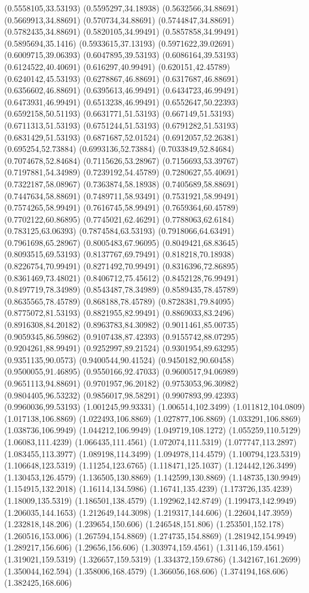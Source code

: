 \documentclass[12pt,letterpaper]{article}
\begin{document}
(0.5558105,33.53193) (0.5595297,34.18938) (0.5632566,34.88691) (0.5669913,34.88691) (0.570734,34.88691) (0.5744847,34.88691) (0.5782435,34.88691) (0.5820105,34.99491) (0.5857858,34.99491) (0.5895694,35.1416) (0.5933615,37.13193) (0.5971622,39.02691) (0.6009715,39.06393) (0.6047895,39.53193) (0.6086164,39.53193) (0.6124522,40.40691) (0.616297,40.99491) (0.620151,42.45789) (0.6240142,45.53193) (0.6278867,46.88691) (0.6317687,46.88691) (0.6356602,46.88691) (0.6395613,46.99491) (0.6434723,46.99491) (0.6473931,46.99491) (0.6513238,46.99491) (0.6552647,50.22393) (0.6592158,50.51193) (0.6631771,51.53193) (0.667149,51.53193) (0.6711313,51.53193) (0.6751244,51.53193) (0.6791282,51.53193) (0.6831429,51.53193) (0.6871687,52.01524) (0.6912057,52.26381) (0.695254,52.73884) (0.6993136,52.73884) (0.7033849,52.84684) (0.7074678,52.84684) (0.7115626,53.28967) (0.7156693,53.39767) (0.7197881,54.34989) (0.7239192,54.45789) (0.7280627,55.40691) (0.7322187,58.08967) (0.7363874,58.18938) (0.7405689,58.88691) (0.7447634,58.88691) (0.7489711,58.93491) (0.7531921,58.99491) (0.7574265,58.99491) (0.7616745,58.99491) (0.7659364,60.45789) (0.7702122,60.86895) (0.7745021,62.46291) (0.7788063,62.6184) (0.783125,63.06393) (0.7874584,63.53193) (0.7918066,64.63491) (0.7961698,65.28967) (0.8005483,67.96095) (0.8049421,68.83645) (0.8093515,69.53193) (0.8137767,69.79491) (0.818218,70.18938) (0.8226754,70.99491) (0.8271492,70.99491) (0.8316396,72.86895) (0.8361469,73.48021) (0.8406712,75.45612) (0.8452128,76.99491) (0.8497719,78.34989) (0.8543487,78.34989) (0.8589435,78.45789) (0.8635565,78.45789) (0.868188,78.45789) (0.8728381,79.84095) (0.8775072,81.53193) (0.8821955,82.99491) (0.8869033,83.2496) (0.8916308,84.20182) (0.8963783,84.30982) (0.9011461,85.00735) (0.9059345,86.59862) (0.9107438,87.42393) (0.9155742,88.07295) (0.9204261,88.99491) (0.9252997,89.21524) (0.9301954,89.63295) (0.9351135,90.0573) (0.9400544,90.41524) (0.9450182,90.60458) (0.9500055,91.46895) (0.9550166,92.47033) (0.9600517,94.06989) (0.9651113,94.88691) (0.9701957,96.20182) (0.9753053,96.30982) (0.9804405,96.53232) (0.9856017,98.58291) (0.9907893,99.42393) (0.9960036,99.53193) (1.001245,99.93331) (1.006514,102.3499) (1.011812,104.0809) (1.017138,106.8869) (1.022493,106.8869) (1.027877,106.8869) (1.033291,106.8869) (1.038736,106.9949) (1.044212,106.9949) (1.049719,108.1272) (1.055259,110.5129) (1.06083,111.4239) (1.066435,111.4561) (1.072074,111.5319) (1.077747,113.2897) (1.083455,113.3977) (1.089198,114.3499) (1.094978,114.4579) (1.100794,123.5319) (1.106648,123.5319) (1.11254,123.6765) (1.118471,125.1037) (1.124442,126.3499) (1.130453,126.4579) (1.136505,130.8869) (1.142599,130.8869) (1.148735,130.9949) (1.154915,132.2018) (1.16114,134.5986) (1.16741,135.4239) (1.173726,135.4239) (1.18009,135.5319) (1.186501,138.4579) (1.192962,142.8749) (1.199473,142.9949) (1.206035,144.1653) (1.212649,144.3098) (1.219317,144.606) (1.22604,147.3959) (1.232818,148.206) (1.239654,150.606) (1.246548,151.806) (1.253501,152.178) (1.260516,153.006) (1.267594,154.8869) (1.274735,154.8869) (1.281942,154.9949) (1.289217,156.606) (1.29656,156.606) (1.303974,159.4561) (1.31146,159.4561) (1.319021,159.5319) (1.326657,159.5319) (1.334372,159.6786) (1.342167,161.2699) (1.350044,162.594) (1.358006,168.4579) (1.366056,168.606) (1.374194,168.606) (1.382425,168.606) 
\end{document}
